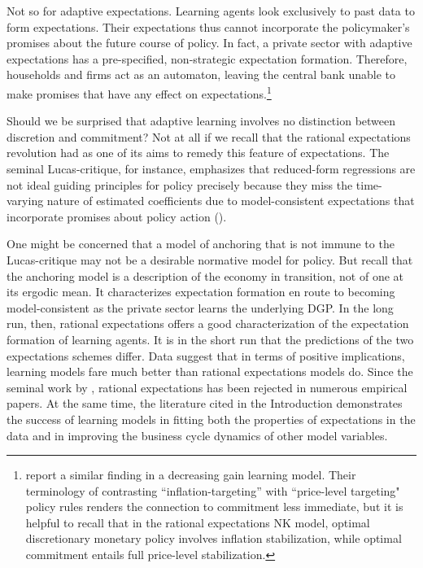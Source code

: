 \documentclass[11pt]{article}
\renewcommand{\[}{\begin{equation}}
\renewcommand{\]}{\end{equation}}
\begin{document}
Not so for adaptive expectations. Learning agents look exclusively to past data to form expectations. Their expectations thus cannot incorporate the policymaker's promises about the future course of policy. In fact, a private sector with adaptive expectations has a pre-specified, non-strategic expectation formation. Therefore, households and firms act as an automaton, leaving the central bank unable to make promises that have any effect on expectations.\footnote{\cite{mele2019perils} report a similar finding in a decreasing gain learning model. Their terminology of contrasting ``inflation-targeting'' with ``price-level targeting" policy rules renders the connection to commitment less immediate, but it is helpful to recall that in the rational expectations NK model, optimal discretionary monetary policy involves inflation stabilization, while optimal commitment entails full price-level stabilization.}

Should we be surprised that adaptive learning involves no distinction between discretion and commitment? Not at all if we recall that the rational expectations revolution had as one of its aims to remedy this feature of expectations. The seminal Lucas-critique, for instance, emphasizes that reduced-form regressions are not ideal guiding principles for policy precisely because they miss the time-varying nature of estimated coefficients due to model-consistent expectations that incorporate promises about policy action (\cite{lucas1976econometric}).

One might be concerned that a model of anchoring that is not immune to the Lucas-critique may not be a desirable normative model for policy. But recall that the anchoring model is a description of the economy in transition, not of one at its ergodic mean. It characterizes expectation formation en route to becoming model-consistent as the private sector learns the underlying DGP. In the long run, then, rational expectations offers a good characterization of the expectation formation of learning agents. It is in the short run that the predictions of the two expectations schemes differ. Data suggest that in terms of positive implications, learning models fare much better than rational expectations models do. Since the seminal work by \cite{coibion2015information}, rational expectations has been rejected in numerous empirical papers. At the same time, the literature cited in the Introduction demonstrates the success of learning models in fitting both the properties of expectations in the data and in improving the business cycle dynamics of other model variables. 
\end{document}
